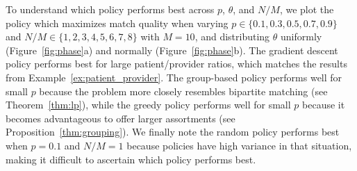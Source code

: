 \begin{example}
\begin{figure*}
    \caption{We characterize which policy maximizes match quality when varying patient/provider ratio and match probability $p$ when $\theta$ is uniformly (left) and normally (right) distributed. The group-based policy performs best for large $p$, the greedy policy performs best for small $p$, and the gradient descent policy performs best when the patient/provider ratio is large.}
    \label{fig:phase}
\end{figure*}
To understand which policy performs best across $p$, $\theta$, and $N/M$, we plot the policy which maximizes match quality when varying $p \in \{0.1,0.3,0.5,0.7,0.9\}$ and $N/M \in \{1,2,3,4,5,6,7,8\}$ with $M=10$, and distributing $\theta$ uniformly (Figure~\ref{fig:phase}a) and normally (Figure~\ref{fig:phase}b). 
The gradient descent policy performs best for large patient/provider ratios, which matches the results from Example~\ref{ex:patient_provider}. 
The group-based policy performs well for small $p$ because the problem more closely resembles bipartite matching (see Theorem~\ref{thm:lp}), while the greedy policy performs well for small $p$ because it becomes advantageous to offer larger assortments (see Proposition~\ref{thm:grouping}).
We finally note the random policy performs best when $p=0.1$ and $N/M=1$ because policies have high variance in that situation, making it difficult to ascertain which policy performs best. 
\end{example}

